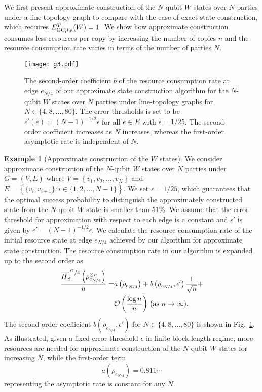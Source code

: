 \documentclass[preprintnumbers,aps,amsmath,amssymb,pra,twocolumn,showpacs,superscriptaddress,floatfix]{revtex4-1}
\theoremstyle{plain}
\theoremstyle{definition}
\newtheorem{example}{Example}
\theoremstyle{remark}
\begin{document}
We first present approximate construction of the $N$-qubit $W$ states over $N$ parties under a line-topology graph to compare with the case of exact state construction, which requires $E_{\textup{GC},i,e}^T(W) = 1$.   We show how approximate construction consumes less resources per copy by increasing the number of copies $n$ and the resource consumption rate varies in terms of the number of parties $N$.

\begin{figure}
\centering
\texttt{[image: g3.pdf]}
\caption{The second-order coefficient $b$ of the resource consumption rate at edge $e_{N/4}$ of our approximate state construction algorithm for the $N$-qubit $W$ states over $N$ parties under line-topology graphs for $N\in\{4,8,\ldots,80\}$.   The error thresholds is set to be $\epsilon'(e)={(N-1)}^{-1/2}\epsilon$ for all $e\in E$ with $\epsilon=1/25$. The second-order coefficient increases as $N$ increases, whereas the first-order asymptotic rate is independent of $N$.}
\label{fig:graph3}
\end{figure}

\begin{example}[Approximate construction of the $W$ states]
\label{ex:4}
We consider approximate construction of the $N$-qubit $W$ states over $N$ parties under $G=(V,E)$ where $V=\left\{v_1,v_2,\ldots,v_N\right\}$ and $E=\left\{\{v_i,v_{i+1}\}\colon i\in\{1,2,\ldots,N-1\}\right\}$.
We set $\epsilon=1/25$, which guarantees that the optimal success probability to distinguish the approximately constructed state from the $N$-qubit $W$ state is smaller than $51$\%.
We assume that the error threshold for approximation with respect to each edge is a constant and $\epsilon'$ is given by $\epsilon'={(N-1)}^{-1/2}\epsilon$.  We calculate the resource consumption rate of the initial resource state at edge $e_{N/4}$ achieved by our algorithm for approximate state construction.  The resource consumption rate in our algorithm is expanded up to the second order as
\begin{equation*}
    \begin{split}
        \frac{\overline{H}_{\textup{S}}^{\epsilon'^2/4}\left(\rho_{e_{N/4}}^{\otimes n}\right)}{n}=&a\left(\rho_{e_{N/4}}\right)+b\left(\rho_{e_{N/4}}, \epsilon'\right)\frac{1}{\sqrt{n}}+\\
        &\mathcal{O}\left(\frac{\log n}{n}\right) \,(\textup{as } n\rightarrow\infty).
    \end{split}
\end{equation*}
The second-order coefficient $b\left(\rho_{e_{N/4}}, \epsilon'\right)$ for $N\in\{4,8,\ldots,80\}$ is shown in Fig.~\ref{fig:graph3}.
As illustrated, given a fixed error threshold $\epsilon$ in finite block length regime, more resources are needed for approximate construction of the $N$-qubit $W$ states for increasing $N$, while the first-order term
\[
  a\left(\rho_{e_{N/4}}\right)=0.811\cdots
\] representing the asymptotic rate is constant for any $N$.
\end{example}
\end{document}
